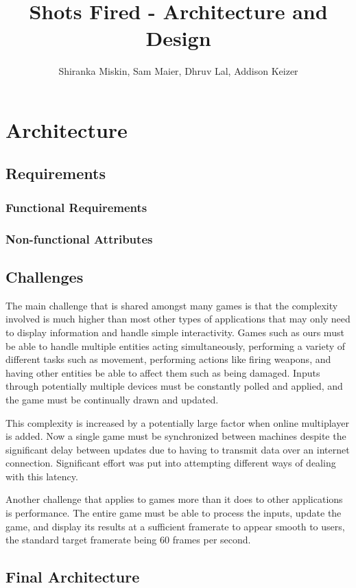 \documentclass[12pt]{report}
\author{Shiranka Miskin, Sam Maier, Dhruv Lal, Addison Keizer}
\title{Shots Fired - Architecture and Design}
\begin{document}
\maketitle

\tableofcontents
\chapter{Architecture}
\section{Requirements}
\subsection{Functional Requirements}
\subsection{Non-functional Attributes}
\section{Challenges}

The main challenge that is shared amongst many games is that the complexity
involved is much higher than most other types of applications that may only need
to display information and handle simple interactivity.  Games such as ours must
be able to handle multiple entities acting simultaneously, performing a variety
of different tasks such as movement, performing actions like firing weapons, and
having other entities be able to affect them such as being damaged.  Inputs
through potentially multiple devices must be constantly polled and applied, and
the game must be continually drawn and updated.

This complexity is increased by a potentially large factor when online
multiplayer is added. Now a single game must be synchronized between machines
despite the significant delay between updates due to having to transmit data
over an internet connection.  Significant effort was put into attempting
different ways of dealing with this latency.

Another challenge that applies to games more than it does to other applications
is performance.  The entire game must be able to process the inputs, update the
game, and display its results at a sufficient framerate to appear smooth to
users, the standard target framerate being 60 frames per second.

\section{Final Architecture}
\end{document}
